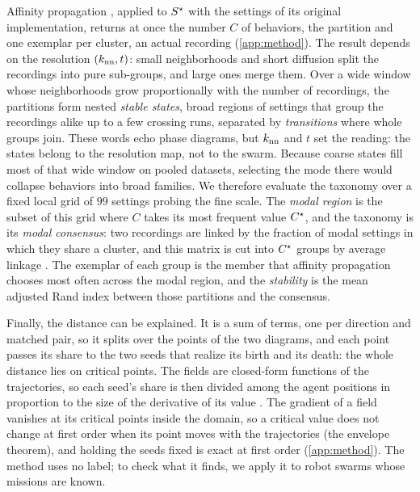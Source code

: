\documentclass[pdflatex,sn-apa]{sn-jnl}
\begin{document}
Affinity propagation \citep{frey2007clustering}, applied to $S^{\star}$ with the settings of its original implementation,
returns at once the number $C$ of behaviors, the partition and one exemplar per cluster, an actual recording
(\cref{app:method}). The result depends on the resolution $(k_{\mathrm{nn}},t)$: small neighborhoods and short diffusion split the
recordings into pure sub-groups, and large ones merge them. Over a wide window whose neighborhoods grow proportionally
with the number of recordings, the partitions form nested \emph{stable states}, broad regions of settings that group the
recordings alike up to a few crossing runs, separated by \emph{transitions} where whole groups join. These words echo phase
diagrams, but $k_{\mathrm{nn}}$ and $t$ set the reading: the states belong to the resolution map, not to the swarm. Because coarse
states fill most of that wide window on pooled datasets, selecting the mode there would collapse behaviors into broad
families. We therefore evaluate the taxonomy over a fixed local grid of $99$ settings probing the fine scale. The
\emph{modal region} is the subset of this grid where $C$ takes its most frequent value $C^{\star}$, and the taxonomy is its
\emph{modal consensus}: two recordings are linked by the fraction of modal settings in which they share a cluster, and
this matrix is cut into $C^{\star}$ groups by average linkage \citep{monti2003consensus}. The exemplar of each group is the
member that affinity propagation chooses most often across the modal region, and the \emph{stability} is the mean
adjusted Rand index between those partitions and the consensus.

Finally, the distance can be explained. It is a sum of terms, one per direction and matched pair, so it splits over the
points of the two diagrams, and each point passes its share to the two seeds that realize its birth and its death: the
whole distance lies on critical points. The fields are closed-form functions of the trajectories, so each seed's share
is then divided among the agent positions in proportion to the size of the derivative of its value
\citep{leygonie2022framework,carriere2021optimizing}. The gradient of a field vanishes at its critical points inside
the domain, so a critical value does not change at first order when its point moves with the trajectories (the
envelope theorem), and holding the seeds fixed is exact at first order (\cref{app:method}). The method uses no label; to check what it finds, we apply it to robot swarms whose missions are known.

\FloatBarrier
\end{document}
